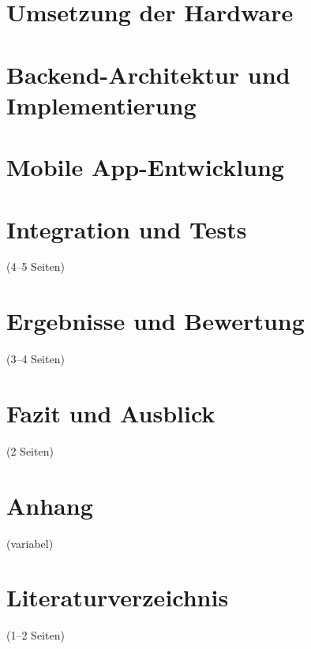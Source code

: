 \documentclass[a4paper, 12pt]{article} %
\begin{document}
\section{Umsetzung der Hardware}
    
\newpage

\section{Backend-Architektur und Implementierung}
    
\newpage

\section{Mobile App-Entwicklung}
    
\newpage

\section{Integration und Tests}(4–5 Seiten)
    
\newpage

\section{Ergebnisse und Bewertung}(3–4 Seiten)

\newpage

\section{Fazit und Ausblick}(2 Seiten)
    
\newpage

\section{Anhang}(variabel)
    
\newpage

\section{Literaturverzeichnis}(1–2 Seiten)
% 
\printbibliography    
\newpage
\end{document}
